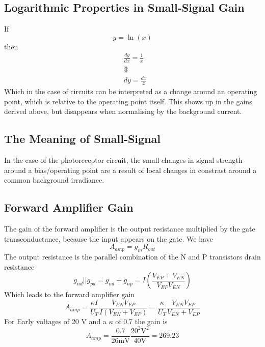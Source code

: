 \subsection{Logarithmic Properties in Small-Signal Gain}
If 
\begin{equation*}
    y = \ln(x)
\end{equation*}
then
\begin{align*}
    &\frac{dy}{dx} = \frac{1}{x} \\
    &\Updownarrow \\
    &dy = \frac{dx}{x}
\end{align*}
Which in the case of circuits can be interpreted as a change around an operating point, which is
relative to the operating point itself. This shows up in the gains derived above, but disappears when normalising
by the background current.

\subsection{The Meaning of Small-Signal}
In the case of the photoreceptor circuit, the small changes in signal strength around a bias/operating point are a 
result of local changes in constrast around a common background irradiance.

\subsection{Forward Amplifier Gain}
The gain of the forward amplifier is the output resistance multiplied by the gate transconductance, because the input
appears on the gate. We have
\begin{equation*}
    A_{amp} = g_m R_{out}
\end{equation*}
The output resistance is the parallel combination of the N and P transistors drain resistance
\begin{equation*}
    g_{nd} || g_{pd} = g_{nd}+g_{np} = I\left(\frac{V_{EP}+V_{EN}}{V_{EP}V_{EN}}\right)
\end{equation*}
Which leads to the forward amplifier gain
\begin{equation*}
    A_{amp} = \frac{\kappa I}{U_T} \frac{V_{EN}V_{EP}}{I(V_{EN} + V_{EP})} = \frac{\kappa}{U_T} \frac{V_{EN}V_{EP}}{V_{EN} + V_{EP}}
\end{equation*}
For Early voltages of 20 V and a \(\kappa\) of 0.7 the gain is
\begin{equation*}
    A_{amp} = \frac{0.7}{26 \mathrm{mV}} \frac{20^2\mathrm{V}^2}{40 \mathrm{V}} = 269.23
\end{equation*}

